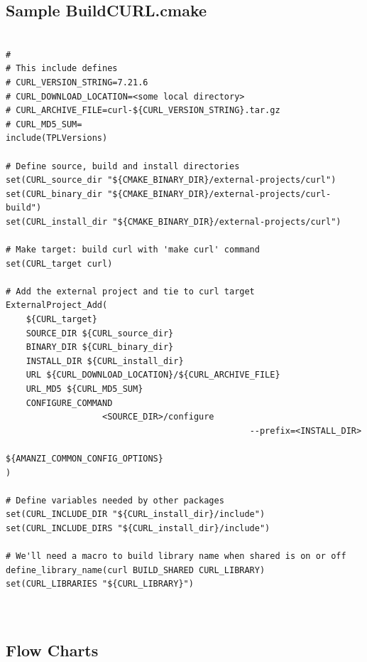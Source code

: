 \documentclass[12pt]{article}
\begin{document}
\subsection{Sample BuildCURL.cmake}
\begin{verbatim}

#
# This include defines
# CURL_VERSION_STRING=7.21.6
# CURL_DOWNLOAD_LOCATION=<some local directory>
# CURL_ARCHIVE_FILE=curl-${CURL_VERSION_STRING}.tar.gz
# CURL_MD5_SUM=
include(TPLVersions)

# Define source, build and install directories
set(CURL_source_dir "${CMAKE_BINARY_DIR}/external-projects/curl")
set(CURL_binary_dir "${CMAKE_BINARY_DIR}/external-projects/curl-build")
set(CURL_install_dir "${CMAKE_BINARY_DIR}/external-projects/curl")

# Make target: build curl with 'make curl' command
set(CURL_target curl)

# Add the external project and tie to curl target
ExternalProject_Add(
    ${CURL_target}
    SOURCE_DIR ${CURL_source_dir}
    BINARY_DIR ${CURL_binary_dir}
    INSTALL_DIR ${CURL_install_dir}
    URL ${CURL_DOWNLOAD_LOCATION}/${CURL_ARCHIVE_FILE}
    URL_MD5 ${CURL_MD5_SUM}
    CONFIGURE_COMMAND
                   <SOURCE_DIR>/configure
                                                --prefix=<INSTALL_DIR>
                                                 ${AMANZI_COMMON_CONFIG_OPTIONS}
)
                                      
# Define variables needed by other packages
set(CURL_INCLUDE_DIR "${CURL_install_dir}/include")
set(CURL_INCLUDE_DIRS "${CURL_install_dir}/include")

# We'll need a macro to build library name when shared is on or off
define_library_name(curl BUILD_SHARED CURL_LIBRARY)
set(CURL_LIBRARIES "${CURL_LIBRARY}")

                                       
\end{verbatim}

\subsection{Flow Charts}
\end{document}
